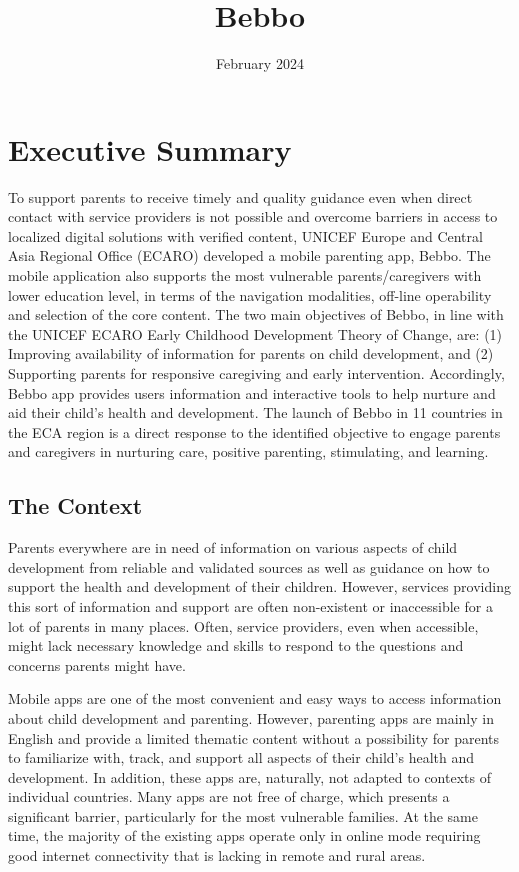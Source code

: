 \documentclass{article}
\title{Bebbo}
\date{February 2024}
\begin{document}
\maketitle

\tableofcontents

\clearpage
\section{Executive Summary}

To support parents to receive timely and quality guidance even when direct contact with service  providers is not possible and overcome barriers in access to localized digital solutions with verified  content, UNICEF Europe and Central Asia Regional Office (ECARO) developed a mobile parenting app,  Bebbo. The mobile application also supports the most vulnerable parents/caregivers with lower  education level, in terms of the navigation modalities, off-line operability and selection of the core  content. The two main objectives of Bebbo, in line with the UNICEF ECARO Early Childhood  Development Theory of Change, are: (1) Improving availability of information for parents on child  development, and (2) Supporting parents for responsive caregiving and early intervention.  Accordingly, Bebbo app provides users information and interactive tools to help nurture and aid their  child’s health and development. The launch of Bebbo in 11 countries in the ECA region is a direct  response to the identified objective to engage parents and caregivers in nurturing care, positive  parenting, stimulating, and learning.

\subsection*{The Context}
Parents everywhere are in need of information on various aspects of child development from reliable  and validated sources as well as guidance on how to support the health and development of their  children. However, services providing this sort of information and support are often non-existent or  inaccessible for a lot of parents in many places. Often, service providers, even when accessible, might  lack necessary knowledge and skills to respond to the questions and concerns parents might have.

Mobile apps are one of the most convenient and easy ways to access information about child  development and parenting. However, parenting apps are mainly in English and provide a limited  thematic content without a possibility for parents to familiarize with, track, and support all aspects of  their child’s health and development. In addition, these apps are, naturally, not adapted to contexts of  individual countries. Many apps are not free of charge, which presents a significant barrier, particularly  for the most vulnerable families. At the same time, the majority of the existing apps operate only in  online mode requiring good internet connectivity that is lacking in remote and rural areas.
\end{document}
